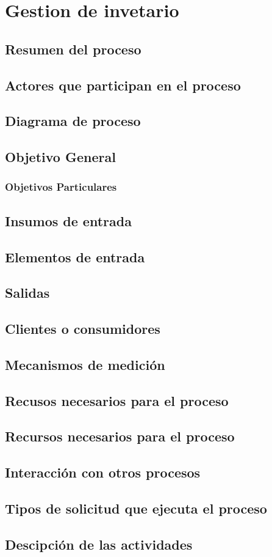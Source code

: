 \hypertarget{procesoGestionDeInventario}{}
\section{Gestion de invetario}
\subsection{Resumen del proceso}
\subsection{Actores que participan en el proceso}
\subsection{Diagrama de proceso}
\subsection{Objetivo General}
\subsubsection{Objetivos Particulares}
\subsection{Insumos de entrada}
\subsection{Elementos de entrada}
\subsection{Salidas}
\subsection{Clientes o consumidores}
\subsection{Mecanismos de medici\'on}
\subsection{Recusos necesarios para el proceso}
\subsection{Recursos necesarios para el proceso}
\subsection{Interacci\'on con otros procesos}
\subsection{Tipos de solicitud que ejecuta el proceso}
\subsection{Descipci\'on de las actividades}
